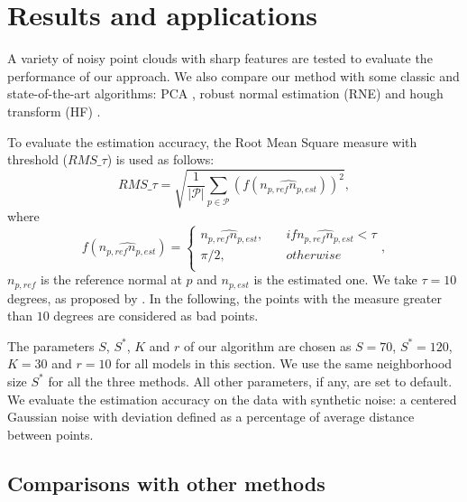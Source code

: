 \section{Results and applications}
\label{sec:results}
A variety of noisy point clouds with sharp features are tested to evaluate the performance of our approach.
We also compare our method with some classic and state-of-the-art algorithms: PCA \cite{DBLP:conf/siggraph/HoppeDDMS92}, robust normal estimation (RNE) \cite{DBLP:journals/cg/LiSKCDJ10} and hough transform (HF) \cite{DBLP:journals/cgf/BoulchM12}.


To evaluate the estimation accuracy, the Root Mean Square measure with threshold ($RMS\_\tau $) \cite{DBLP:journals/cgf/BoulchM12} is used as follows:
\begin{equation}\label{eq:NEE}
RMS\_\tau = \sqrt{\frac{1}{|\mathcal{P}|}\sum_{p\in \mathcal{P}}(f(\widehat{n_{p,ref}n_{p,est}}))^{2}},
\end{equation}
where
$$f(\widehat{n_{p,ref}n_{p,est}})=\left \{
\begin{array}{rl}
    \widehat{n_{p,ref}n_{p,est}}, \quad & if\widehat{n_{p,ref}n_{p,est}}<\tau \\
    \pi /2,\quad & otherwise \\
\end{array}
\right. ,
$$
$n_{p,ref}$ is the reference normal at $p$ and $n_{p,est}$  is the
estimated one.
%
We take $\tau = 10$ degrees, as proposed by \cite{DBLP:journals/cgf/BoulchM12}. In the following, the points with the measure greater than $10$ degrees are considered as bad points.

The parameters $S$, $S^{*}$, $K$ and $r$ of our algorithm are chosen as $S=70$, $S^{*}=120$, $K=30$ and $r=10$ for all models in this section.
%
We use the same neighborhood size $S^{*}$ for all the three methods.
All other parameters, if any, are set to default.
%
We evaluate the estimation accuracy on the data with synthetic noise: a centered Gaussian noise with deviation defined as a percentage of average distance between points.

\subsection{Comparisons with other methods}

